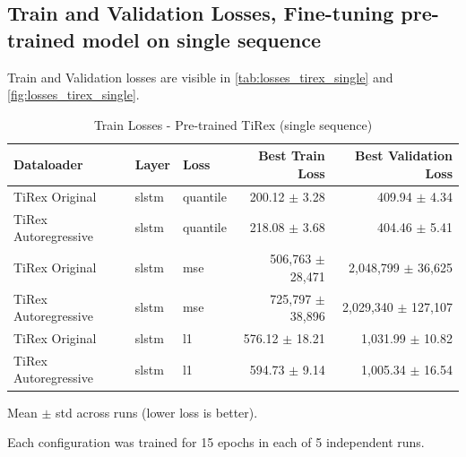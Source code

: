 \documentclass[a4paper,oneside,10pt,ngerman,english]{scrartcl}
\begin{document}
\subsection{Train and Validation Losses, Fine-tuning pre-trained model on single sequence}
\label{sec:losses_tirex_single}

Train and Validation losses are visible in \autoref{tab:losses_tirex_single} and \autoref{fig:losses_tirex_single}.

\begin{table}[htbp]
	\centering
	\begin{threeparttable}
		\caption{Train Losses - Pre-trained TiRex (single sequence)}
		\label{tab:losses_tirex_single}
		\setlength{\tabcolsep}{3pt}
		\begin{tabular}{lllrr}
			\toprule
			\textbf{Dataloader} & \textbf{Layer} & \textbf{Loss} &
			\textbf{Best Train Loss} & \textbf{Best Validation Loss}\\
			\midrule
			
			TiRex Original & slstm & quantile &
			\cellcolor[HTML]{006837}\color[HTML]{f1f1f1}200.12 $\pm$ 3.28 &
			409.94 $\pm$ 4.34 \\
			
			TiRex Autoregressive & slstm & quantile &
			218.08 $\pm$ 3.68 & 
			\cellcolor[HTML]{006837}\color[HTML]{f1f1f1}404.46 $\pm$ 5.41	 \\
			
			\midrule
			
			TiRex Original & slstm & mse &
			\cellcolor[HTML]{006837}\color[HTML]{f1f1f1}506,763 $\pm$ 28,471 &
			2,048,799 $\pm$ 36,625 \\
			
			TiRex Autoregressive & slstm & mse &
			725,797 $\pm$ 38,896 & 
			\cellcolor[HTML]{006837}\color[HTML]{f1f1f1}2,029,340 $\pm$ 127,107 \\
			
			\midrule
			
			TiRex Original & slstm & l1 &
			\cellcolor[HTML]{006837}\color[HTML]{f1f1f1}576.12 $\pm$ 18.21 &
			1,031.99 $\pm$ 10.82	 \\
			
			TiRex Autoregressive & slstm & l1 &
			594.73 $\pm$ 9.14 & 
			\cellcolor[HTML]{006837}\color[HTML]{f1f1f1}1,005.34 $\pm$ 16.54 \\
			
			\bottomrule
		\end{tabular}
		
		\begin{tablenotes}
			\small
			\item[a] Mean $\pm$ std across runs (lower loss is better).
			\item[b] Each configuration was trained for 15 epochs in each of 5 independent runs.
		\end{tablenotes}
	\end{threeparttable}
\end{table}
\end{document}
